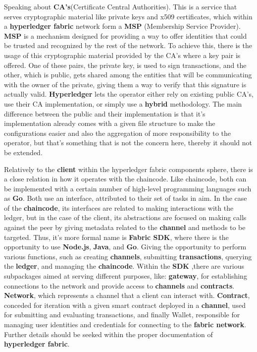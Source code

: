Speaking about \textbf{CA's}(Certificate Central Authorities). This is a service that serves cryptographic material like private 
keys and x509 certificates, which within a \textbf{hyperledger fabric} network form a \textbf{MSP} (Membership Service Provider). \textbf{MSP}
is a mechanism designed for providing a way to offer identities that could be trusted and recognized by the rest of the 
network. To achieve this, there is the usage of this cryptographic material provided by the CA's where a key 
pair is offered. One of these pairs, the private key, is used to sign transactions, and the other, which is public, gets shared among 
the entities that will be communicating with the owner of the private, giving them a way to verify that this signature is actually 
valid. \textbf{Hyperledger} lets the operator either rely on existing public CA's, use their CA implementation, or simply use 
a \textbf{hybrid} methodology. The main difference between the public and their implementation is that it's implementation already 
comes with a given file structure to make the configurations easier and also the aggregation of more responsibility to the operator, but 
that's something that is not the concern here, thereby it should not be extended.

Relatively to the \textbf{client} within the hyperledger fabric components sphere, there is a close relation in
how it operates with the chaincode. Like chaincode, both can be implemented with a certain number of
high-level programming languages such as \textbf{Go}. Both use an interface, attributed to their set of tasks in aim.
In the case of the \textbf{chaincode}, its interfaces are related to making interactions with the ledger, but in the case
of the client, its abstractions are focused on making calls against the peer by giving metadata related to
the \textbf{channel} and methods to be targeted. Thus, it’s more formal name is \textbf{Fabric SDK}, where there is the
opportunity to use \textbf{Node.js}, \textbf{Java}, and \textbf{Go}. Giving the opportunity to perform various functions, such as
creating \textbf{channels}, submitting \textbf{transactions}, querying the \textbf{ledger}, and managing the \textbf{chaincode}. Within
the \textbf{SDK} ,there are various subpackages aimed at serving different purposes, like: \textbf{gateway}, for establishing
connections to the network and provide access to \textbf{channels} and \textbf{contracts}. \textbf{Network}, which represents
a channel that a client can interact with. \textbf{Contract}, conceded for iteration with a given smart contract
deployed in a \textbf{channel}, used for submitting and evaluating transactions, and finally Wallet, responsible for
managing user identities and credentials for connecting to the \textbf{fabric network}. Further details should be
seeked within the proper documentation of \textbf{hyperledger fabric}.

